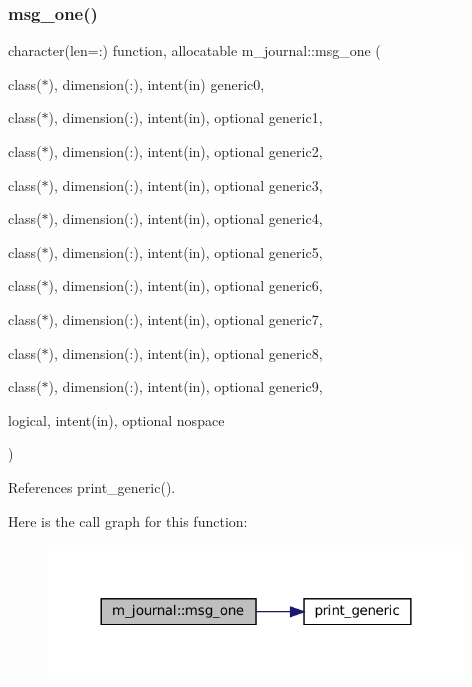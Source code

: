 \subsubsection{\texorpdfstring{msg\+\_\+one()}{msg\_one()}}
{\footnotesize\ttfamily character(len=\+:) function, allocatable m\+\_\+journal\+::msg\+\_\+one (\begin{DoxyParamCaption}\item[{class($\ast$), dimension(\+:), intent(in)}]{generic0,  }\item[{class($\ast$), dimension(\+:), intent(in), optional}]{generic1,  }\item[{class($\ast$), dimension(\+:), intent(in), optional}]{generic2,  }\item[{class($\ast$), dimension(\+:), intent(in), optional}]{generic3,  }\item[{class($\ast$), dimension(\+:), intent(in), optional}]{generic4,  }\item[{class($\ast$), dimension(\+:), intent(in), optional}]{generic5,  }\item[{class($\ast$), dimension(\+:), intent(in), optional}]{generic6,  }\item[{class($\ast$), dimension(\+:), intent(in), optional}]{generic7,  }\item[{class($\ast$), dimension(\+:), intent(in), optional}]{generic8,  }\item[{class($\ast$), dimension(\+:), intent(in), optional}]{generic9,  }\item[{logical, intent(in), optional}]{nospace }\end{DoxyParamCaption})\hspace{0.3cm}{\ttfamily [private]}}



References print\+\_\+generic().

Here is the call graph for this function\+:\nopagebreak
\begin{figure}[H]
\begin{center}
\leavevmode
\includegraphics[width=312pt]{namespacem__journal_a1b516ae6ba2da17e10847cf68d6833b1_cgraph}
\end{center}
\end{figure}
\mbox{\label{namespacem__journal_a7906bba242b412d6941f4b32233b7eca}} 
